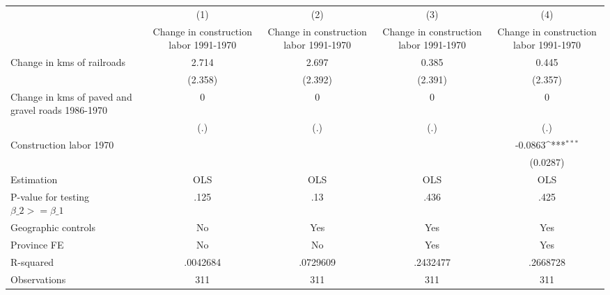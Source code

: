 {
\def\sym#1{\ifmmode^{#1}\else\(^{#1}\)\fi}
\begin{tabular}{l*{4}{c}}
\hline\hline
                &\multicolumn{1}{c}{(1)}&\multicolumn{1}{c}{(2)}&\multicolumn{1}{c}{(3)}&\multicolumn{1}{c}{(4)}\\
                &\multicolumn{1}{c}{Change in construction labor 1991-1970}&\multicolumn{1}{c}{Change in construction labor 1991-1970}&\multicolumn{1}{c}{Change in construction labor 1991-1970}&\multicolumn{1}{c}{Change in construction labor 1991-1970}\\
\hline
Change in kms of railroads&    2.714         &    2.697         &    0.385         &    0.445         \\
                &  (2.358)         &  (2.392)         &  (2.391)         &  (2.357)         \\
[1em]
Change in kms of paved and gravel roads 1986-1970&        0         &        0         &        0         &        0         \\
                &      (.)         &      (.)         &      (.)         &      (.)         \\
[1em]
Construction labor 1970&                  &                  &                  &  -0.0863\sym{***}\\
                &                  &                  &                  & (0.0287)         \\
\hline
Estimation      &      OLS         &      OLS         &      OLS         &      OLS         \\
P-value for testing $\beta\_2 >= \beta\_1$&     .125         &      .13         &     .436         &     .425         \\
Geographic controls&       No         &      Yes         &      Yes         &      Yes         \\
Province FE     &       No         &       No         &      Yes         &      Yes         \\
R-squared       & .0042684         & .0729609         & .2432477         & .2668728         \\
Observations    &      311         &      311         &      311         &      311         \\
\hline\hline
\end{tabular}
}
